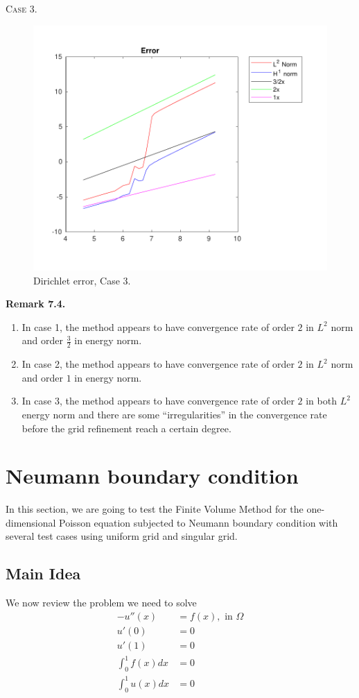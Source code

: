 \documentclass[a4paper]{article}
\numberwithin{equation}{section}
\begin{document}
\newpage
\textsc{Case 3.}
\begin{figure}[H]
\centering\includegraphics[width=13.5cm]{fig_dirichlet_error_G2_CP1_I1_M100_C3}
\caption{Dirichlet error, Case 3.}
\end{figure}
\noindent\textbf{Remark 7.4.}
\begin{enumerate}
\item In case 1, the method appears to have convergence rate of order $2$ in $L^2$ norm and order $\frac{3}{2}$ in energy norm.
\item In case 2, the method appears to have convergence rate of order $2$ in $L^2$ norm and order $1$ in energy norm.
\item In case 3, the method appears to have convergence rate of order $2$ in both $L^2$ energy norm and there are some ``irregularities'' in the convergence rate before the grid refinement reach a certain degree.
\end{enumerate}
\newpage
\section{Neumann boundary condition}
	In this section, we are going to test the Finite Volume Method for the one-dimensional Poisson equation subjected to Neumann boundary condition with several test cases using uniform grid and singular grid.
\subsection{Main Idea}
	We now review the problem we need to solve
\begin{align}
	-u''(x)&=f(x), \mbox{ in }\Omega \\
	u'(0)&=0 \\
	u'(1)&=0 \\
\int_{0}^{1}f(x)dx&=0 \\
\int_{0}^{1}u(x)dx&=0 \label{intu0}
\end{align}
\end{document}
